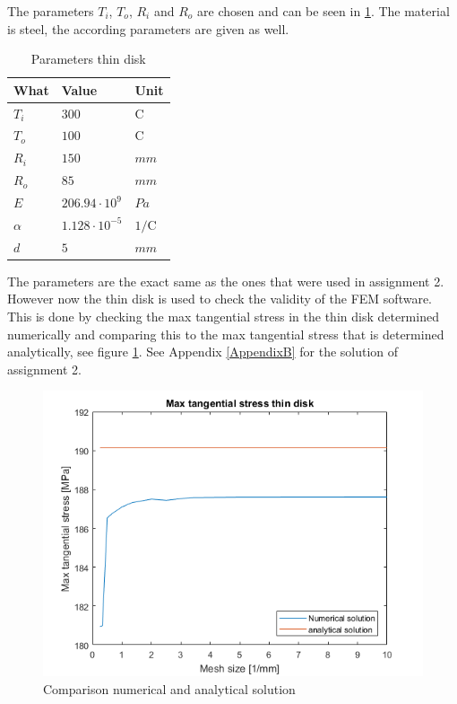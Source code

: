 The parameters $T_i$, $T_o$, $R_i$ and $R_o$ are chosen and can be seen in \ref{table:thin_disk}. The material is steel, the according parameters are given as well.\newline
\begin{center}
\begin{table}[H]
\caption{Parameters thin disk}
\begin{center}
\begin{tabular}[c]{|l|l|l|}
\hline
\label{table:thin_disk}
What & Value & Unit\\
\hline
$T_i$ & $300$ & \textdegree{}C\\
$T_o$ & $100$ & \textdegree{}C\\
$R_i$ & $150$ & $mm$\\
$R_o$ & $85$ & $mm$\\
$E$ & $206.94\cdot 10^9$ & $Pa$\\
$\alpha$ & $1.128\cdot 10^{-5}$ & $1/$\textdegree{}C \\
$d$ & $5$ & $mm$\\
\hline
\end{tabular}
\end{center}

\end{table}
\end{center}


The parameters are the exact same as the ones that were used in assignment 2. However now the thin disk is used to check the validity of the FEM software. This is done by checking the max tangential stress in the thin disk determined numerically  and comparing this to the max tangential stress that is determined analytically, see figure \ref{fig:Ass2NumVsAna}. See Appendix \ref{AppendixB} for the solution of assignment 2. 

\begin{figure} [H]
	\centering
	\includegraphics[width=0.8\linewidth]{Figures/Numerical_Analytical_Tangential.png}
	\caption{Comparison numerical and analytical solution}
    \label{fig:Ass2NumVsAna}
\end{figure}

